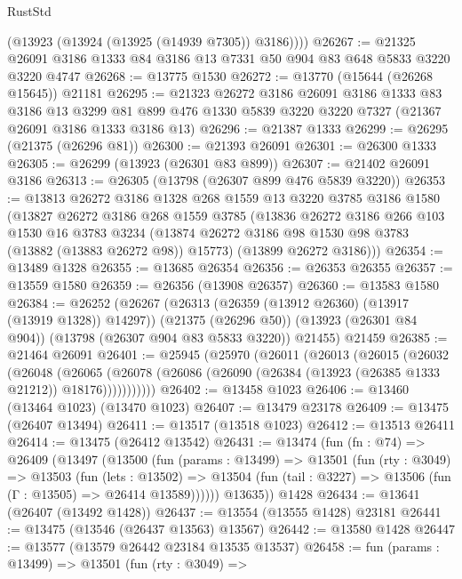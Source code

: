 \begin{lexlean}{RustStd}
\begin{coremodule}
        (@13923 (@13924 (@13925 (@14939 @7305)) @3186))))
@26267 := @21325 @26091 @3186 @1333 @84 @3186 @13 @7331 @50 @904 @83 @648 @5833 @3220 @3220 @4747
@26268 := @13775 @1530
@26272 := @13770 (@15644 (@26268 @15645)) @21181
@26295 := @21323
    @26272
    @3186
    @26091
    @3186
    @1333
    @83
    @3186
    @13
    @3299
    @81
    @899
    @476
    @1330
    @5839
    @3220
    @3220
    @7327
    (@21367 @26091 @3186 @1333 @3186 @13)
@26296 := @21387 @1333
@26299 := @26295 (@21375 (@26296 @81))
@26300 := @21393 @26091
@26301 := @26300 @1333
@26305 := @26299 (@13923 (@26301 @83 @899))
@26307 := @21402 @26091 @3186
@26313 := @26305 (@13798 (@26307 @899 @476 @5839 @3220))
@26353 := @13813
    @26272
    @3186
    @1328
    @268
    @1559
    @13
    @3220
    @3785
    @3186
    @1580
    (@13827
      @26272
      @3186
      @268
      @1559
      @3785
      (@13836
        @26272
        @3186
        @266
        @103
        @1530
        @16
        @3783
        @3234
        (@13874 @26272 @3186 @98 @1530 @98 @3783 (@13882 (@13883 @26272 @98)) @15773)
        (@13899 @26272 @3186)))
@26354 := @13489 @1328
@26355 := @13685 @26354
@26356 := @26353 @26355
@26357 := @13559 @1580
@26359 := @26356 (@13908 @26357)
@26360 := @13583 @1580
@26384 := @26252
    (@26267
      (@26313 (@26359 (@13912 @26360) (@13917 (@13919 @1328)) @14297))
      (@21375 (@26296 @50))
      (@13923 (@26301 @84 @904))
      (@13798 (@26307 @904 @83 @5833 @3220))
      @21455)
    @21459
@26385 := @21464 @26091
@26401 := @25945
    (@25970
      (@26011
        (@26013
          (@26015
            (@26032
              (@26048
                (@26065
                  (@26078 (@26086 (@26090 (@26384 (@13923 (@26385 @1333 @21212)) @18176)))))))))))
@26402 := @13458 @1023
@26406 := @13460 (@13464 @1023) (@13470 @1023)
@26407 := @13479 @23178
@26409 := @13475 (@26407 @13494)
@26411 := @13517 (@13518 @1023)
@26412 := @13513 @26411
@26414 := @13475 (@26412 @13542)
@26431 := @13474
    (fun (fn : @74) =>
    @26409
      (@13497
        (@13500
          (fun (params : @13499) =>
          @13501
            (fun (rty : @3049) =>
            @13503
              (fun (lets : @13502) =>
              @13504 (fun (tail : @3227) => @13506 (fun (Γ : @13505) => @26414 @13589))))))
        @13635))
    @1428
@26434 := @13641 (@26407 (@13492 @1428))
@26437 := @13554 (@13555 @1428) @23181
@26441 := @13475 (@13546 (@26437 @13563) @13567)
@26442 := @13580 @1428
@26447 := @13577 (@13579 @26442 @23184 @13535 @13537)
@26458 := fun (params : @13499) =>
  @13501
    (fun (rty : @3049) =>

\end{coremodule}
\end{lexlean}
